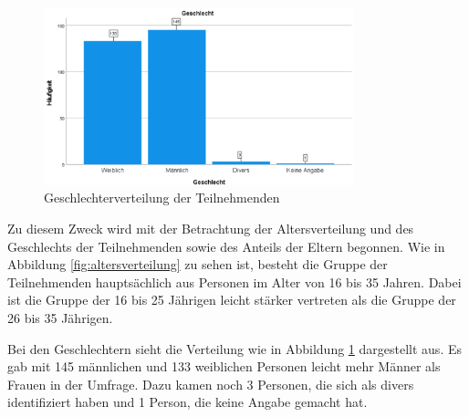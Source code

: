 \begin{figure}[h]
    \centering
    \includegraphics[width=0.8\textwidth]{04_Artefakte/01_Abbildungen/deskriptiv_geschlecht.png}
    \caption{Geschlechterverteilung der Teilnehmenden}
    \label{fig:geschlechterverteilung}
\end{figure}

Zu diesem Zweck wird mit der Betrachtung der Altersverteilung und des Geschlechts der Teilnehmenden sowie des Anteils der Eltern begonnen.
Wie in Abbildung \ref{fig:altersverteilung} zu sehen ist, besteht die Gruppe der Teilnehmenden hauptsächlich aus Personen im Alter von 16 bis 35 Jahren.
Dabei ist die Gruppe der 16 bis 25 Jährigen leicht stärker vertreten als die Gruppe der 26 bis 35 Jährigen.

Bei den Geschlechtern sieht die Verteilung wie in Abbildung \ref{fig:geschlechterverteilung} dargestellt aus. Es gab mit 145 männlichen und 133 weiblichen Personen leicht
mehr Männer als Frauen in der Umfrage. Dazu kamen noch 3 Personen, die sich als divers identifiziert haben und 1 Person, die keine Angabe gemacht hat.


